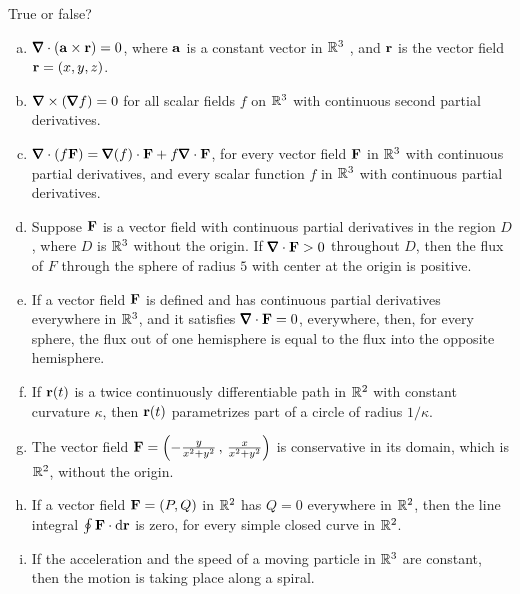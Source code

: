 

\begin{question}[M317 2013D] %
True or false?
\begin{enumerate}[(a)]
\item
$\vnabla\cdot(\va \times\vr) = 0$, where $\mathbf{a}$ is a constant vector in 
$\mathbb{R}^3$ , and $\mathbf{r}$ is the vector field $\mathbf{r}= (x, y, z)$.
\item
$\vnabla\times(\vnabla f) = 0$ for all scalar fields $f$ on $\mathbb{R}^3$ 
with continuous second partial derivatives.
\item
$\vnabla\cdot(f \vF) = \vnabla(f)\cdot \vF + f \vnabla\cdot\vF$, 
for every vector field $\mathbf{F}$ in $\mathbb{R}^3$ with continuous partial derivatives, 
and every scalar function $f$ in $\mathbb{R}^3$ with continuous partial
derivatives.
\item
Suppose $\mathbf{F}$ is a vector field with continuous partial derivatives 
in the region $D$, where $D$ is $\mathbb{R}^3$ without the origin. 
If $\vnabla\cdot\vF  > 0$ throughout $D$, then the flux of $F$ 
through the sphere of radius $5$ with center at the origin is positive.
\item
If a vector field $\mathbf{F}$ is defined and has continuous partial 
derivatives everywhere in $\mathbb{R}^3$, and it satisfies $\vnabla\cdot\vF = 0$, everywhere, then, for every sphere, the flux out of one hemisphere is equal 
to the flux into the opposite hemisphere.
\item
If $\mathbf{r}(t)$ is a twice continuously differentiable path in $\mathbb{R}^2$ 
with constant curvature $\kappa$, then $\mathbf{r}(t)$ parametrizes part of a 
circle of radius $1/\kappa$.
\item
The vector field $\mathbf{F} = \left( -\frac{y}{x^2+y^2}\,,\,\frac{x}{x^2+y^2}\right)$
is conservative in its domain, which is $\mathbb{R}^2$, without the origin.
\item
If a vector field $\mathbf{F} = (P, Q)$ in $\mathbb{R}^2$ has $Q = 0$ everywhere in 
$\mathbb{R}^2$, then the line integral $\oint\mathbf{F}\cdot\mathrm{d}\mathbf{r}$ is zero, for every simple closed curve in $\mathbb{R}^2$.
\item
If the acceleration and the speed of a moving particle in $\mathbb{R}^3$ 
are constant, then the motion is taking place along a spiral.
\end{enumerate}
\end{question}

